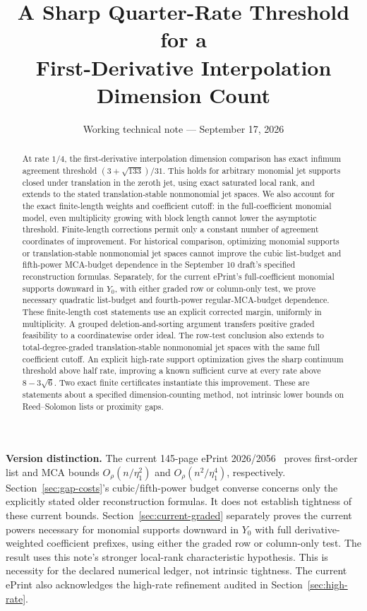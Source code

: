 \documentclass[11pt]{article}
\title{A Sharp Quarter-Rate Threshold for a\\First-Derivative Interpolation Dimension Count}
\author{}
\date{Working technical note --- September 17, 2026}
\theoremstyle{remark}\newtheorem{remark}[theorem]{Remark}
\begin{document}
\maketitle
\begin{abstract}
At rate $1/4$, the first-derivative interpolation dimension comparison
has exact infimum agreement threshold $(3+\sqrt{133})/31$. This holds
for arbitrary monomial jet supports closed under translation in the
zeroth jet, using exact saturated local rank, and extends to the stated
translation-stable nonmonomial jet spaces. We also account for the exact
finite-length weights and coefficient cutoff: in the full-coefficient
monomial model, even multiplicity growing with block length cannot lower
the asymptotic threshold. Finite-length corrections permit only a
constant number of agreement coordinates of improvement. For historical comparison, optimizing monomial supports or
translation-stable nonmonomial jet spaces cannot improve the cubic
list-budget and fifth-power MCA-budget dependence in the September 10
draft's specified reconstruction formulas. Separately, for the current
ePrint's full-coefficient monomial supports downward in $Y_0$, with either
graded row or column-only test, we prove necessary
quadratic list-budget and fourth-power regular-MCA-budget dependence.
These finite-length cost statements use an explicit corrected margin,
uniformly in multiplicity. A grouped deletion-and-sorting argument transfers
positive graded feasibility to a coordinatewise order ideal. The row-test
conclusion also extends to total-degree-graded translation-stable nonmonomial
jet spaces with the same full coefficient cutoff. An explicit high-rate support optimization gives the sharp continuum
threshold above half rate, improving a known sufficient curve at every
rate above $8-3\sqrt6$. Two exact
finite certificates instantiate this improvement.
These are statements about a specified dimension-counting method, not
intrinsic lower bounds on Reed--Solomon lists or proximity gaps.
\end{abstract}

\noindent\textbf{Version distinction.} The current 145-page ePrint
2026/2056~\cite{DKTcurrent} proves first-order list and MCA bounds
$O_\rho(n/\eta_1^2)$ and $O_\rho(n^2/\eta_1^4)$, respectively.
Section~\ref{sec:gap-costs}'s cubic/fifth-power budget converse concerns
only the explicitly stated older reconstruction formulas. It does not
establish tightness of these current bounds. Section~\ref{sec:current-graded}
separately proves the current powers necessary for monomial supports
downward in $Y_0$ with full derivative-weighted coefficient prefixes,
using either the graded row or column-only test. The result uses this note's stronger local-rank
characteristic hypothesis. This is necessity for the declared numerical
ledger, not intrinsic tightness. The current ePrint also
acknowledges the high-rate refinement audited in Section~\ref{sec:high-rate}.
\end{document}
